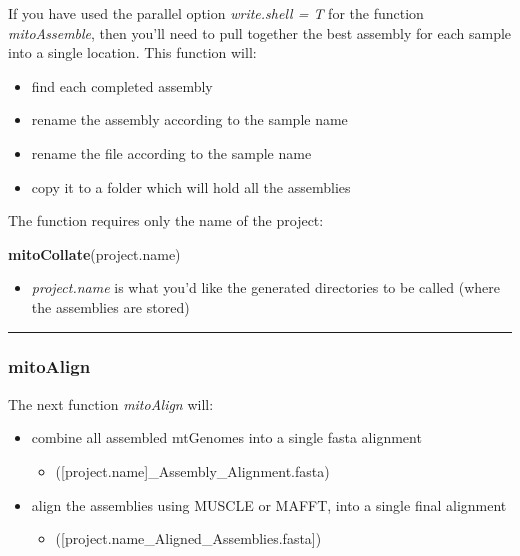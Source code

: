 \documentclass[]{article}
\newenvironment{Shaded}{\begin{snugshade}}{\end{snugshade}}
\newcommand{\KeywordTok}[1]{\textcolor[rgb]{0.13,0.29,0.53}{\textbf{#1}}}
\newcommand{\NormalTok}[1]{#1}
\providecommand{\tightlist}{%
  \setlength{\itemsep}{0pt}\setlength{\parskip}{0pt}}
\renewcommand{\linethickness}{0.05em}
\begin{document}
If you have used the parallel option \emph{write.shell = T} for the
function \emph{mitoAssemble}, then you'll need to pull together the best
assembly for each sample into a single location. This function will:

\begin{itemize}
\tightlist
\item
  find each completed assembly
\item
  rename the assembly according to the sample name
\item
  rename the file according to the sample name
\item
  copy it to a folder which will hold all the assemblies
\end{itemize}

The function requires only the name of the project:

\begin{Shaded}
\begin{Highlighting}[]
\KeywordTok{mitoCollate}\NormalTok{(project.name)}
\end{Highlighting}
\end{Shaded}

\begin{itemize}
\tightlist
\item
  \emph{project.name} is what you'd like the generated directories to be
  called (where the assemblies are stored)
\end{itemize}

\begin{center}\rule{0.5\linewidth}{\linethickness}\end{center}

\hypertarget{mitoalign}{%
\subsubsection{mitoAlign}\label{mitoalign}}

The next function \emph{mitoAlign} will:

\begin{itemize}
\tightlist
\item
  combine all assembled mtGenomes into a single fasta alignment

  \begin{itemize}
  \tightlist
  \item
    ({[}project.name{]}\_Assembly\_Alignment.fasta)\\
  \end{itemize}
\item
  align the assemblies using MUSCLE or MAFFT, into a single final
  alignment

  \begin{itemize}
  \tightlist
  \item
    ({[}project.name\_Aligned\_Assemblies.fasta{]})
  \end{itemize}
\end{itemize}
\end{document}
